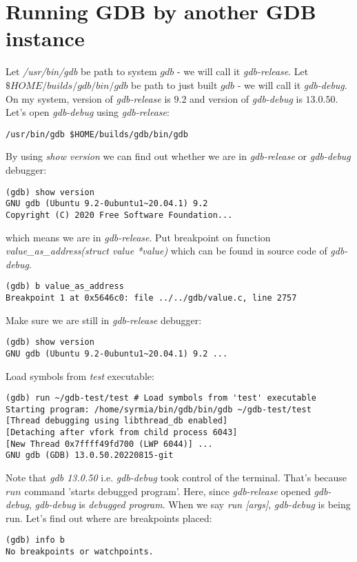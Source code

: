 \documentclass{report}
\begin{document}
\section *{Running GDB by another GDB instance}
Let  \textit{/usr/bin/gdb} be path to system $gdb$ - we will call it \textit{gdb-release}. Let $\$HOME/builds/gdb/bin/gdb$ be path to just built $gdb$ - we will call it \textit{gdb-debug}.
On my system, version of \textit{gdb-release} is $9.2$ and version of \textit{gdb-debug} is $13.0.50$.
Let's open \textit{gdb-debug} using \textit{gdb-release}:
\begin{verbatim}
/usr/bin/gdb $HOME/builds/gdb/bin/gdb
\end{verbatim}
By using \textit{show version} we can find out whether we are in \textit{gdb-release} or \textit{gdb-debug} debugger:
\begin{verbatim}
(gdb) show version
GNU gdb (Ubuntu 9.2-0ubuntu1~20.04.1) 9.2
Copyright (C) 2020 Free Software Foundation...
\end{verbatim}
which means we are in \textit{gdb-release}. Put breakpoint on function \textit{value\_as\_address(struct value *value)} which can be found in source code of \textit{gdb-debug}.
\begin{verbatim}
(gdb) b value_as_address
Breakpoint 1 at 0x5646c0: file ../../gdb/value.c, line 2757
\end{verbatim}
Make sure we are still in \textit{gdb-release} debugger:
\begin{verbatim}
(gdb) show version
GNU gdb (Ubuntu 9.2-0ubuntu1~20.04.1) 9.2 ...
\end{verbatim}
Load symbols from \textit{test} executable:
\begin{verbatim}
(gdb) run ~/gdb-test/test # Load symbols from 'test' executable
Starting program: /home/syrmia/bin/gdb/bin/gdb ~/gdb-test/test
[Thread debugging using libthread_db enabled]
[Detaching after vfork from child process 6043]
[New Thread 0x7ffff49fd700 (LWP 6044)] ...
GNU gdb (GDB) 13.0.50.20220815-git
\end{verbatim}
Note that \textit{gdb 13.0.50} i.e. \textit{gdb-debug} took control of the terminal. That's because $run$ command 'starts debugged program'. Here, since \textit{gdb-release} opened \textit{gdb-debug}, \textit{gdb-debug} is \textit{debugged program}. When we say \textit{run [args]}, \textit{gdb-debug} is being run. Let's find out where are breakpoints placed:
\begin{verbatim}
(gdb) info b
No breakpoints or watchpoints.
\end{verbatim}
\end{document}
